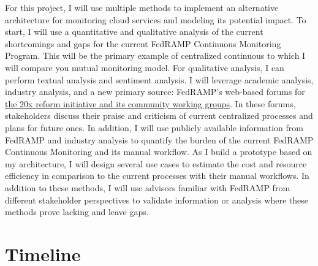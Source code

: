 \documentclass{jdf}
\begin{document}
For this project, I will use multiple methods to implement an alternative architecture for monitoring cloud services and modeling its potential impact. To start, I will use a quantitative and qualitative analysis of the current shortcomings and gaps for the current FedRAMP Continuous Monitoring Program. This will be the primary example of centralized continuous to which I will compare you mutual monitoring model. For qualitative analysis, I can perform textual analysis and sentiment analysis. I will leverage academic analysis, industry analysis, and a new primary source: FedRAMP's web-based forums for \hyperlink{https://www.fedramp.gov/20x/working-groups/}{the 20x reform initiative and its community working groups}. In these forums, stakeholders discuss their praise and criticism of current centralized processes and plans for future ones. In addition, I will use publicly available information from FedRAMP and industry analysis to quantify the burden of the current FedRAMP Continuous Monitoring and its manual workflow. As I build a prototype based on my architecture, I will design several use cases to estimate the cost and resource efficiency in comparison to the current processes with their manual workflows. In addition to these methods, I will use advisors familiar with FedRAMP from different stakeholder perspectives to validate information or analysis where these methods prove lacking and leave gaps.

\section*{Timeline}
\end{document}
